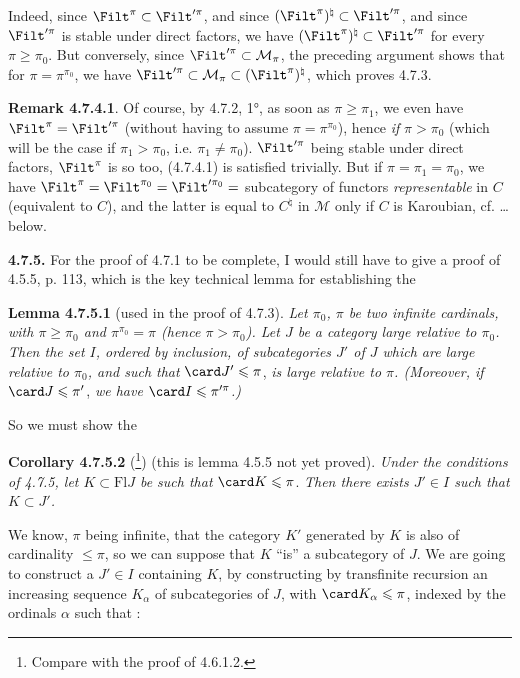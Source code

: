 Indeed, since $\Filt^{\pi} \subset \Filt'^{\pi}$, and since $(\Filt^{\pi})^{\natural} \subset \Filt'^{\pi}$, and since $\Filt'^{\pi}$ is stable under direct factors, we have $(\Filt^{\pi})^{\natural} \subset \Filt'^{\pi}$ for every $\pi \geqslant \pi_0$. But conversely, since $\Filt'^{\pi} \subset \mathcal{M}_{\pi}$, the preceding argument shows that for $\pi = \pi^{\pi_0}$, we have $\Filt'^{\pi} \subset \mathcal{M}_{\pi} \subset (\Filt^{\pi})^{\natural}$, which proves 4.7.3.

\textbf{Remark 4.7.4.1}. Of course, by 4.7.2, 1°, as soon as $\pi \geqslant \pi_1$, we even have $\Filt^{\pi} = \Filt'^{\pi}$ (without having to assume $\pi = \pi^{\pi_0}$), hence \textit{if} $\pi > \pi_0$ (which will be the case if $\pi_1 > \pi_0$, i.e. $\pi_1 \neq \pi_0$). $\Filt'^{\pi}$ being stable under direct factors, $\Filt^{\pi}$ is so too, (4.7.4.1) is satisfied trivially. But if $\pi = \pi_1 = \pi_0$, we have $\Filt^{\pi} = \Filt^{\pi_0} = \Filt'^{\pi_0} =$ subcategory of functors \textit{representable} in $C$ (equivalent to $C$), and the latter is equal to $C^{\natural}$ in $\mathcal{M}$ only if $C$ is Karoubian, cf. \ldots{} below. %


\textbf{4.7.5.} For the proof of 4.7.1 to be complete, I would still have to give a proof of 4.5.5, p. 113, which is the key technical lemma for establishing the

\textbf{Lemma 4.7.5.1} (used in the proof of 4.7.3). \textit{Let $\pi_0$, $\pi$ be two infinite cardinals, with $\pi \geqslant \pi_0$ and $\pi^{\pi_0} = \pi$ (hence $\pi > \pi_0$). Let $J$ be a category large relative to $\pi_0$. Then the set $I$, ordered by inclusion, of subcategories $J'$ of $J$ which are large relative to $\pi_0$, and such that} $\card J' \leqslant \pi$, \textit{is large relative to $\pi$. (Moreover, if} $\card J \leqslant \pi'$, \textit{we have} $\card I \leqslant \pi'^{\pi}$\textit{.)}

So we must show the

\textbf{Corollary 4.7.5.2} (\footnote[70]{Compare with the proof of 4.6.1.2.}) (this is lemma 4.5.5 not yet proved). \textit{Under the conditions of 4.7.5, let $K \subset \mathrm{Fl} J$ be such that} $\card K \leqslant \pi$. \textit{Then there exists $J' \in I$ such that $K \subset J'$.}

We know, $\pi$ being infinite, that the category $K'$ generated by $K$ is also of cardinality $\leqslant \pi$, so we can suppose that $K$ ``is'' a subcategory of $J$. We are going to construct a $J' \in I$ containing $K$, by constructing by transfinite recursion an increasing sequence $K_{\alpha}$ of subcategories of $J$, with $\card K_{\alpha} \leqslant \pi$, indexed by the ordinals $\alpha$ such that \fbox{$\card \alpha \leqslant \pi$}:

